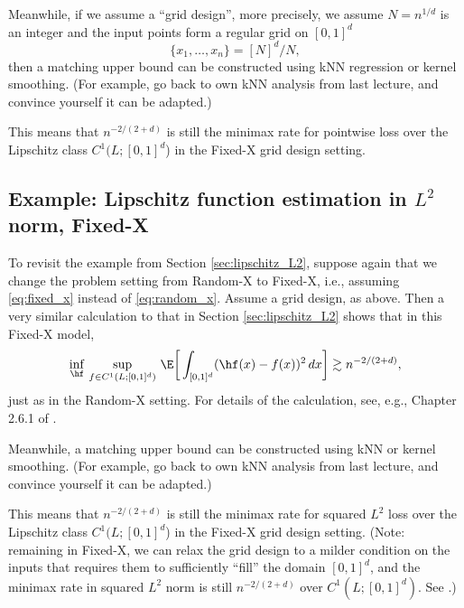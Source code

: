 \documentclass{article}
\begin{document}
Meanwhile, if we assume a ``grid design'', more precisely, we assume $N =
n^{1/d}$ is an integer and the input points form a regular grid on $[0,1]^d$
\[
\{x_1, \dots, x_n\} = [N]^d / N,
\]
then a matching upper bound can be constructed using kNN regression or kernel
smoothing. (For example, go back to own kNN analysis from last lecture, and
convince yourself it can be adapted.)  


This means that $n^{-2/(2+d)}$ is still the minimax rate for pointwise loss over
the Lipschitz class $C^1(L; [0,1]^d$) in the Fixed-X grid design setting.

\subsection{Example: Lipschitz function estimation in $L^2$ norm, Fixed-X}  

To revisit the example from Section \ref{sec:lipschitz_L2}, suppose again that
we change the problem setting from Random-X to Fixed-X, i.e., assuming
\eqref{eq:fixed_x} instead of \eqref{eq:random_x}. Assume a grid design, as
above. Then a very similar calculation to that in Section \ref{sec:lipschitz_L2}
shows that in this Fixed-X model,    
\[
\inf_{\hf} \, \sup_{f \in C^1(L; [0,1]^d)} \, \E \bigg[ \int_{[0,1]^d} (\hf(x) -
f(x))^2 \, dx \bigg] \gtrsim n^{-2/(2+d)}, 
\]
just as in the Random-X setting. For details of the calculation, see, e.g.,
Chapter 2.6.1 of \citet{tsybakov2009introduction}.      


Meanwhile, a matching upper bound can be constructed using kNN or kernel
smoothing. (For example, go back to own kNN analysis from last lecture, and
convince yourself it can be adapted.)  


This means that $n^{-2/(2+d)}$ is still the minimax rate for squared $L^2$ loss
over the Lipschitz class $C^1(L; [0,1]^d$) in the Fixed-X grid design
setting. (Note: remaining in Fixed-X, we can relax the grid design to a milder
condition on the inputs that requires them to sufficiently ``fill'' the domain
$[0,1]^d$, and the minimax rate in squared $L^2$ norm is still $n^{-2/(2+d)}$
over $C^1(L; [0,1]^d)$. See \citet{stone1982optimal}.) 
\end{document}
